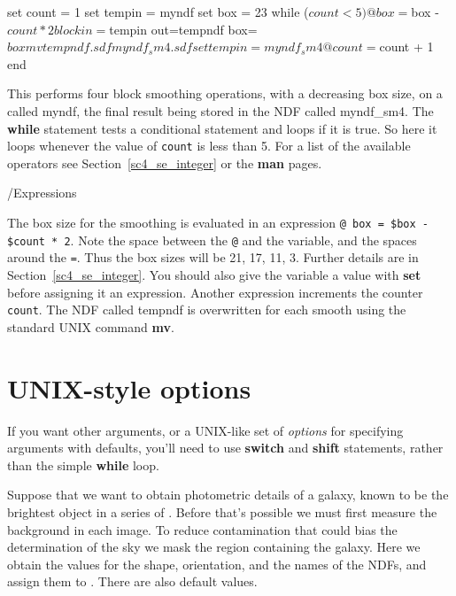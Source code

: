 \documentclass[twoside,11pt,nolof]{starlink}
\providecommand{\latexelsehtml}[2]{#1}
\providecommand{\NDFref}[1]{\xref{#1}{sun33}{}}
\begin{document}
\begin{small}
\begin{terminalv}
     set count = 1
     set tempin = myndf
     set box = 23
     while ($count < 5)
        @ box = $box - $count * 2
        block in=$tempin out=tempndf box=$box
        mv tempndf.sdf myndf_sm4.sdf
        set tempin = myndf_sm4
        @ count = $count + 1
     end
\end{terminalv}
\end{small}
This performs four block smoothing operations, with a decreasing box
size, on a \NDFref{\textsf{NDF}} called myndf, the final result being
stored in the NDF called myndf\_sm4.  The \textbf{while} statement tests
a conditional statement and loops if it is true.  So here it loops
whenever the value of \texttt{count} is less than 5.
\latexelsehtml{For a list of the available operators
see Section~\ref{sc4_se_integer} or the \textbf{man}
pages.}{Click \htmlref{here}{sc4_se_integer} to see examples of other
operators.}

\begin{small}
\begin{terminalv}
     /Expressions
\end{terminalv}
\end{small}

The box size for the smoothing is evaluated in an expression
\mbox{\texttt{@ box = \$box - \$count * 2}}.  Note the space between the
\texttt{@} and the variable, and the spaces around the \texttt{=}.  Thus
the box sizes will be 21, 17, 11, 3.  Further details are
\latexelsehtml{in
Section~\ref{sc4_se_integer}.}{\htmlref{here}{sc4_se_integer}.}
You should also give the variable a value with \textbf{set} before
assigning it an expression.  Another expression increments the counter
\texttt{count}.  The NDF called tempndf is overwritten for each smooth
using the standard UNIX command \textbf{mv}.

\newpage
\section{UNIX-style options
\label{sc4_se_unix_options}}

If you want other arguments, or a UNIX-like set of \emph{options\/}
for specifying arguments with defaults, you'll need to use \textbf{switch}
and \textbf{shift} statements, rather than the simple \textbf{while} loop.

Suppose that we want to obtain photometric details of a galaxy, known
to be the brightest object in a series of \NDFref{\textsf{NDF}s}.  Before
that's possible we must first measure the background in each image.
To reduce contamination that could bias the determination of the sky
we mask the region containing the galaxy.  Here we obtain the values
for the shape, orientation, and the names of the NDFs, and assign them
to .  There are also default values.
\end{document}
